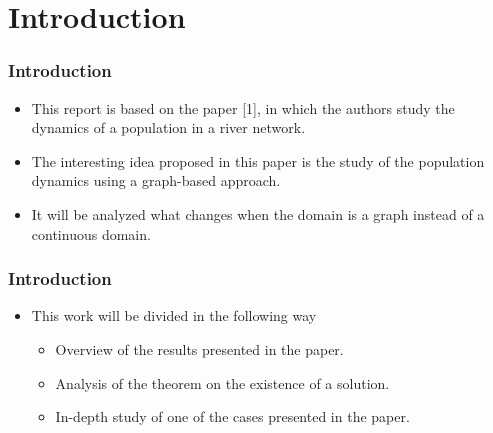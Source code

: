 \section{Introduction}


\begin{frame}
    \frametitle{Introduction}
    \begin{itemize}
        \item This report is based on the paper [1], in which the authors study the dynamics of a population in a river network.
        \item The interesting idea proposed in this paper is the study of the population dynamics using a graph-based approach. 
        \item It will be analyzed what changes when the domain is a graph instead of a continuous domain.
    \end{itemize}
\end{frame}


\begin{frame}
    \frametitle{Introduction}
    \begin{itemize}
        \item This work will be divided in the following way
        \begin{itemize}
            \item Overview of the results presented in the paper.
            \item Analysis of the theorem on the existence of a solution.
            \item In-depth study of one of the cases presented in the paper.
        \end{itemize}
    \end{itemize}
\end{frame}

